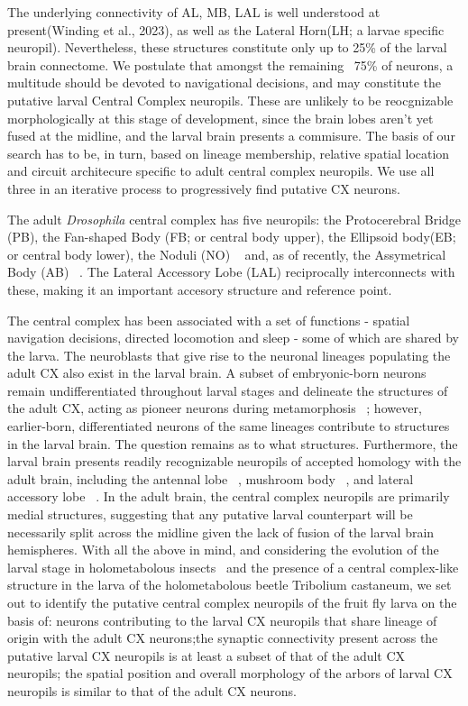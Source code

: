 The underlying connectivity of AL, MB, LAL is well understood at present(Winding et al., 2023), as well as the Lateral Horn(LH; a larvae specific neuropil). Nevertheless, these structures constitute only up to 25\% of the larval brain connectome. We postulate that amongst the remaining ~75\% of neurons, a multitude should be devoted to navigational decisions, and may constitute the putative larval Central Complex neuropils. These are unlikely to be reocgnizable morphologically at this stage of development, since the brain lobes aren't yet fused at the midline, and the larval brain presents a commisure. The basis of our search has to be, in turn, based on lineage membership, relative spatial location and circuit architecure specific to adult central complex neuropils. We use all three in an iterative process to progressively find putative CX neurons.


The adult \textit{\textit{Drosophila}} central complex has five neuropils: the Protocerebral Bridge (PB), the Fan-shaped Body (FB; or central body upper), the Ellipsoid body(EB; or central body lower), the Noduli (NO) ~\citep{hanesch1989neuronal} and, as of recently, the Assymetrical Body (AB) ~\citep{wolff2018neuroarchitecture}. The Lateral Accessory Lobe (LAL) reciprocally interconnects with these, making it an important accesory structure and reference point. 

The central complex has been associated with a set of functions - spatial navigation decisions, directed locomotion and sleep - some of which are shared by the larva. The neuroblasts that give rise to the neuronal lineages populating the adult CX also exist in the larval brain. A subset of embryonic-born neurons remain undifferentiated throughout larval stages and delineate the structures of the adult CX, acting as pioneer neurons during metamorphosis 
~\citep{andrade2019developmentally}; however, earlier-born, differentiated neurons of the same lineages contribute to structures in the larval brain. The question remains as to what structures. Furthermore, the larval brain presents readily recognizable neuropils of accepted homology with the adult brain, including the antennal lobe ~\citep{berck2016wiring}, mushroom body ~\citep{eichler2017complete}, and lateral accessory lobe ~\citep{hartenstein2015lineage}.
 In the adult brain, the central complex neuropils are primarily medial structures, suggesting that any putative larval counterpart will be necessarily split across the midline given the lack of fusion of the larval brain hemispheres. With all the above in mind, and considering the evolution of the larval stage in holometabolous insects ~\citep{truman1999origins}and the presence of a central complex-like structure in the larva of the holometabolous beetle Tribolium castaneum, we set out to identify the putative central complex neuropils of the fruit fly larva on the basis of: neurons contributing to the larval CX neuropils that share lineage of origin with the adult CX neurons;the synaptic connectivity present across the putative larval CX neuropils is at least a subset of that of the adult CX neuropils; the spatial position and overall morphology of the arbors of larval CX neuropils is similar to that of the adult CX neurons. 

